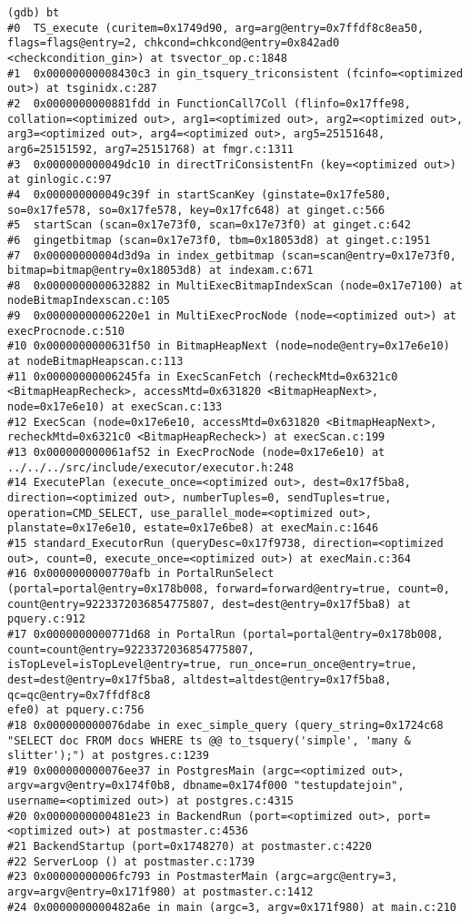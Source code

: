 \documentclass[
]{article}
\begin{document}
\begin{verbatim}
(gdb) bt
#0  TS_execute (curitem=0x1749d90, arg=arg@entry=0x7ffdf8c8ea50, flags=flags@entry=2, chkcond=chkcond@entry=0x842ad0 <checkcondition_gin>) at tsvector_op.c:1848
#1  0x00000000008430c3 in gin_tsquery_triconsistent (fcinfo=<optimized out>) at tsginidx.c:287
#2  0x0000000000881fdd in FunctionCall7Coll (flinfo=0x17ffe98, collation=<optimized out>, arg1=<optimized out>, arg2=<optimized out>, arg3=<optimized out>, arg4=<optimized out>, arg5=25151648, arg6=25151592, arg7=25151768) at fmgr.c:1311
#3  0x000000000049dc10 in directTriConsistentFn (key=<optimized out>) at ginlogic.c:97
#4  0x000000000049c39f in startScanKey (ginstate=0x17fe580, so=0x17fe578, so=0x17fe578, key=0x17fc648) at ginget.c:566
#5  startScan (scan=0x17e73f0, scan=0x17e73f0) at ginget.c:642
#6  gingetbitmap (scan=0x17e73f0, tbm=0x18053d8) at ginget.c:1951
#7  0x00000000004d3d9a in index_getbitmap (scan=scan@entry=0x17e73f0, bitmap=bitmap@entry=0x18053d8) at indexam.c:671
#8  0x0000000000632882 in MultiExecBitmapIndexScan (node=0x17e7100) at nodeBitmapIndexscan.c:105
#9  0x00000000006220e1 in MultiExecProcNode (node=<optimized out>) at execProcnode.c:510
#10 0x0000000000631f50 in BitmapHeapNext (node=node@entry=0x17e6e10) at nodeBitmapHeapscan.c:113
#11 0x00000000006245fa in ExecScanFetch (recheckMtd=0x6321c0 <BitmapHeapRecheck>, accessMtd=0x631820 <BitmapHeapNext>, node=0x17e6e10) at execScan.c:133
#12 ExecScan (node=0x17e6e10, accessMtd=0x631820 <BitmapHeapNext>, recheckMtd=0x6321c0 <BitmapHeapRecheck>) at execScan.c:199
#13 0x000000000061af52 in ExecProcNode (node=0x17e6e10) at ../../../src/include/executor/executor.h:248
#14 ExecutePlan (execute_once=<optimized out>, dest=0x17f5ba8, direction=<optimized out>, numberTuples=0, sendTuples=true, operation=CMD_SELECT, use_parallel_mode=<optimized out>, planstate=0x17e6e10, estate=0x17e6be8) at execMain.c:1646
#15 standard_ExecutorRun (queryDesc=0x17f9738, direction=<optimized out>, count=0, execute_once=<optimized out>) at execMain.c:364
#16 0x0000000000770afb in PortalRunSelect (portal=portal@entry=0x178b008, forward=forward@entry=true, count=0, count@entry=9223372036854775807, dest=dest@entry=0x17f5ba8) at pquery.c:912
#17 0x0000000000771d68 in PortalRun (portal=portal@entry=0x178b008, count=count@entry=9223372036854775807, isTopLevel=isTopLevel@entry=true, run_once=run_once@entry=true, dest=dest@entry=0x17f5ba8, altdest=altdest@entry=0x17f5ba8, qc=qc@entry=0x7ffdf8c8
efe0) at pquery.c:756
#18 0x000000000076dabe in exec_simple_query (query_string=0x1724c68 "SELECT doc FROM docs WHERE ts @@ to_tsquery('simple', 'many & slitter');") at postgres.c:1239
#19 0x000000000076ee37 in PostgresMain (argc=<optimized out>, argv=argv@entry=0x174f0b8, dbname=0x174f000 "testupdatejoin", username=<optimized out>) at postgres.c:4315
#20 0x0000000000481e23 in BackendRun (port=<optimized out>, port=<optimized out>) at postmaster.c:4536
#21 BackendStartup (port=0x1748270) at postmaster.c:4220
#22 ServerLoop () at postmaster.c:1739
#23 0x00000000006fc793 in PostmasterMain (argc=argc@entry=3, argv=argv@entry=0x171f980) at postmaster.c:1412
#24 0x0000000000482a6e in main (argc=3, argv=0x171f980) at main.c:210
\end{verbatim}
\end{document}
